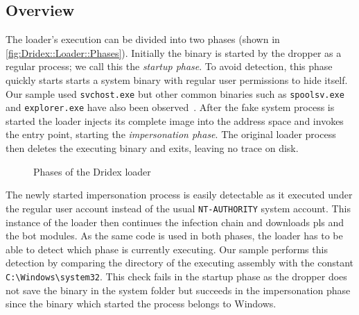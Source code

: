 \subsection{Overview\label{subsec:Reverse_engineering_Dridex::Loader_stage::Overview}}
The loader's execution can be divided into two phases (shown in \autoref{fig:Dridex::Loader::Phases}).
Initially the binary is started by the dropper as a regular process; we call this the \emph{startup phase}.
To avoid detection, this phase quickly starts starts a system binary with regular user permissions to hide itself.
Our sample used \lstinline|svchost.exe| but other common binaries such as \lstinline|spoolsv.exe| and \lstinline|explorer.exe| have also been observed~\cite{bogdan2015dridex, hutchins2017lets}.
After the fake system process is started the loader injects its complete image into the address space and invokes the entry point, starting the \emph{impersonation phase}.
The original loader process then deletes the executing binary and exits, leaving no trace on disk.

\begin{figure}[htb]
    \centering
    \caption{Phases of the Dridex loader\label{fig:Dridex::Loader::Phases}}
\end{figure}

The newly started impersonation process is easily detectable as it executed under the regular user account instead of the usual \lstinline|NT-AUTHORITY| system account.
This instance of the loader then continues the infection chain and downloads \glspl{pl} and the \gls{bot} modules.
As the same code is used in both phases, the loader has to be able to detect which phase is currently executing.
Our sample performs this detection by comparing the directory of the executing assembly with the constant \lstinline|C:\Windows\system32|.
This check fails in the startup phase as the dropper does not save the binary in the system folder but succeeds in the impersonation phase since the binary which started the process belongs to Windows.

